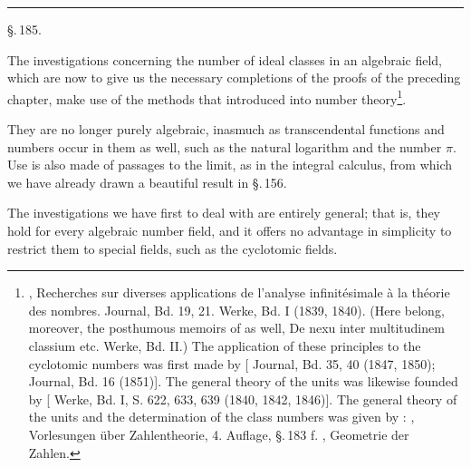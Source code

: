 
\begin{center}


\rule{4em}{0.4pt}

\S.\,185.

\end{center}

The investigations concerning the number of ideal classes in an algebraic field, which are now to give us the necessary completions of the proofs of the preceding chapter, make use of the methods that  introduced into number theory\begingroup\renewcommand{\thefootnote}{\arabic{footnote})}\footnote{, Recherches sur diverses applications de l'analyse infinitésimale à la théorie des nombres.  Journal, Bd. 19, 21.  Werke, Bd. I (1839, 1840). (Here belong, moreover, the posthumous memoirs of  as well, \glqq De nexu inter multitudinem classium etc.\grqq{}  Werke, Bd. II.) The application of these principles to the cyclotomic numbers was first made by  [ Journal, Bd. 35, 40 (1847, 1850);  Journal, Bd. 16 (1851)]. The general theory of the units was likewise founded by  [ Werke, Bd. I, S. 622, 633, 639 (1840, 1842, 1846)]. The general theory of the units and the determination of the class numbers was given by : , Vorlesungen über Zahlentheorie, 4. Auflage, \S.\,183 f. , Geometrie der Zahlen.}\endgroup.

They are no longer purely algebraic, inasmuch as transcendental functions and numbers occur in them as well, such as the natural logarithm and the number $\pi$. Use is also made of passages to the limit, as in the integral calculus, from which we have already drawn a beautiful result in \S.\,156.

The investigations we have first to deal with are entirely general; that is, they hold for every algebraic number field, and it offers no advantage in simplicity to restrict them to special fields, such as the cyclotomic fields.

